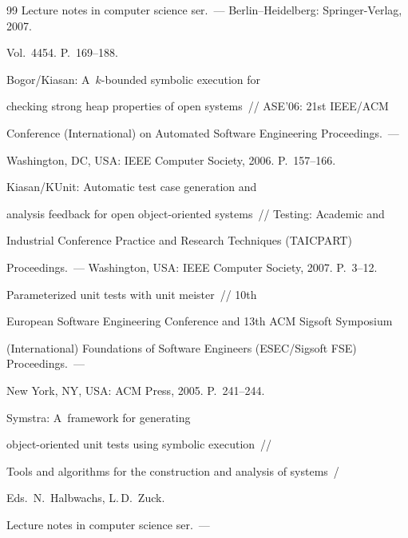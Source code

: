 {{\begin{thebibliography}{99}
Lecture notes in computer science ser.~--- Berlin--Heidelberg: Springer-Verlag, 2007.


 Vol.~4454. P.~169--188.







 Bogor/Kiasan: A~$k$-bounded symbolic execution for


checking strong heap properties of open systems~/\!\!/ ASE'06: 21st IEEE/ACM


Conference (International) on Automated Software Engineering Proceedings.~---


Washington, DC, USA: IEEE Computer Society, 2006. P.~157--166.







 Kiasan/KUnit: Automatic test case generation and


analysis feedback for open object-oriented systems~/\!\!/ Testing: Academic and


Industrial Conference Practice and Research Techniques (TAICPART)


Proceedings.~--- Washington, USA: IEEE Computer Society, 2007. P.~3--12.







 Parameterized unit tests with unit meister~// 10th


European Software Engineering  Conference and 13th ACM Sigsoft  Symposium


(International) Foundations of Software Engineers (ESEC/Sigsoft FSE) Proceedings.~---


New York, NY, USA: ACM Press, 2005. P.~241--244.







 Symstra: A~framework for generating


object-oriented unit tests using symbolic execution~/\!\!/


Tools and algorithms for the construction and analysis of systems~/


Eds.\ N.~Halbwachs, L.\,D.~Zuck.


Lecture notes in computer science ser.~---



\end{thebibliography}}}
